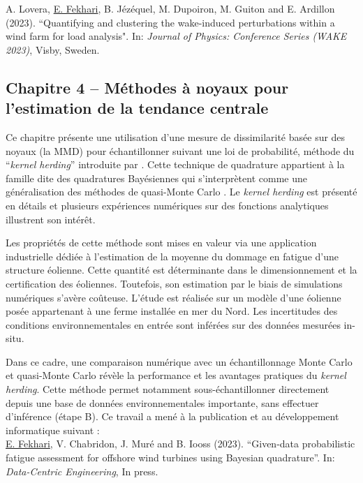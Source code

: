 \noindent
{} A. Lovera, \underline{E. Fekhari}, B. Jézéquel, M. Dupoiron, M. Guiton and E. Ardillon (2023). ``Quantifying and clustering the wake-induced perturbations within a wind farm for load analysis". In: \textit{Journal of Physics: Conference Series (WAKE 2023)}, Visby, Sweden. 

\subsection*{Chapitre 4 -- Méthodes à noyaux pour l'estimation de la tendance centrale}

Ce chapitre présente une utilisation d'une mesure de dissimilarité basée sur des noyaux (la MMD) pour échantillonner suivant une loi de probabilité, méthode du ``\textit{kernel herding}'' introduite par \cite{chen_welling_2010}. 
Cette technique de quadrature appartient à la famille dite des \og quadratures Bayésiennes \fg{} \cite{briol_oates_2019} qui s'interprètent comme une généralisation des méthodes de quasi-Monte Carlo \cite{hickernell_2020}. 
Le \textit{kernel herding} est présenté en détails et plusieurs expériences numériques sur des fonctions analytiques illustrent son intérêt. 

Les propriétés de cette méthode sont mises en valeur via une application industrielle dédiée à l'estimation de la moyenne du dommage en fatigue d'une structure éolienne. 
Cette quantité est déterminante dans le dimensionnement et la certification des éoliennes. 
Toutefois, son estimation par le biais de simulations numériques s'avère coûteuse. 
L'étude est réalisée sur un modèle d'une éolienne posée appartenant à une ferme installée en mer du Nord. 
Les incertitudes des conditions environnementales en entrée sont inférées sur des données mesurées in-situ. 

Dans ce cadre, une comparaison numérique avec un échantillonnage Monte Carlo et quasi-Monte Carlo révèle la performance et les avantages pratiques du \textit{kernel herding}.
Cette méthode permet notamment sous-échantillonner directement depuis une base de données environnementales importante, sans effectuer d'inférence (étape B). 
Ce travail a mené à la publication et au développement informatique suivant : \\

\noindent
{} \underline{E. Fekhari}, V. Chabridon, J. Muré and B. Iooss (2023). ``Given-data probabilistic fatigue assessment for offshore wind turbines using Bayesian quadrature''. In: \textit{Data-Centric Engineering}, In press.\\

